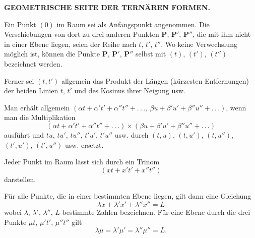 
\begin{center}
\large\bfseries GEOMETRISCHE SEITE DER TERNÄREN FORMEN.
\end{center}



Ein Punkt $(0)$ im Raum sei als Anfangspunkt angenommen. Die Verschiebungen von dort zu drei
anderen Punkten $\boldsymbol{P}$, $\boldsymbol{P}'$, $\boldsymbol{P}''$, die mit ihm nicht
in einer Ebene liegen, seien der Reihe nach $t$, $t'$, $t''$. Wo keine Verwechslung möglich
ist, können die Punkte $\boldsymbol{P}$, $\boldsymbol{P}'$, $\boldsymbol{P}''$ selbst mit $(t)$,
$(t')$, $(t'')$ bezeichnet werden.

Ferner sei $(t,t')$ allgemein das Produkt der Längen (kürzesten Entfernungen) der beiden
Linien $t$, $t'$ und des Kosinus ihrer Neigung usw.

Man erhält allgemein $(\alpha t + \alpha' t' + \alpha'' t'' + .\,.\,.,\ \beta u + \beta' u' +
\beta'' u'' + .\,.\,.)$, wenn man die Multiplikation
\[
(\alpha t + \alpha' t' + \alpha'' t'' + .\,.\,.) \times (\beta u + \beta' u' + \beta'' u'' + .\,.\,.)
\]
ausführt und $tu$, $tu'$, $tu''$, $t'u'$, $t'u''$ usw. durch $(t,u)$, $(t,u')$,
$(t,u'')$, $(t',u')$, $(t',u'')$ usw. ersetzt.

Jeder Punkt im Raum lässt sich durch ein Trinom
\[
(xt + x't' + x''t'')
\]
darstellen.

Für alle Punkte, die in einer bestimmten Ebene liegen, gilt dann eine Gleichung
\[
\lambda x + \lambda' x' + \lambda'' x'' = L
\]
wobei $\lambda$, $\lambda'$, $\lambda''$, $L$ bestimmte Zahlen bezeichnen. Für eine
Ebene durch die drei Punkte $\mu t$, $\mu' t'$, $\mu'' t''$ gilt
\[
\lambda\mu = \lambda'\mu' = \lambda''\mu'' = L.
\]
